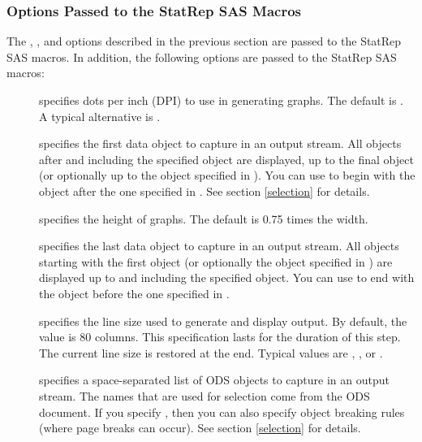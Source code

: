 \documentclass[article,oneside]{memoir}
\newcommand*{\StatRep}{\textsf{StatRep}\xspace}
\begin{document}
  \subsubsection{Options Passed to the  \textsf{StatRep} SAS Macros}\label{sasopts}
The , , and  options described in the previous
section are passed to the \StatRep SAS macros.
In addition, the following options are passed to the \StatRep SAS macros:
  \begin{description}
    \item[] specifies dots per inch (DPI) to use in generating graphs.
  The default is . A typical alternative is .

  \item[] specifies the first data object to capture in an output stream.
  All objects after and including the specified object
  are displayed, up to the final object
 (or optionally up to the object specified in ).
  You can use  to begin with the object after the one specified in .
  See section \ref{selection} for details.

  \item[] specifies the height of graphs. The default is 0.75 times the width.

  \item[] specifies the last data object to capture in an output stream.
  All objects starting with the first object
  (or optionally the object specified in ) are displayed up to and
  including the specified object.
  You can use  to end with the object before the one specified in .

\item[] specifies the line size used to generate and display
      output. By default, the value is 80 columns.
     This specification lasts for the duration of this step. The current line size is
     restored at the end.
     Typical values are , , or .

  \item[] specifies a space-separated list of ODS objects to capture
  in an output stream.
  The names that are used for selection come from the ODS document.
  If you specify , then you can also specify object breaking rules
  (where page breaks can occur). See section \ref{selection} for details.


\end{description}
\end{document}
